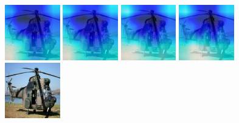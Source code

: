 \begin{figure}[H]
  {\includegraphics[height=2.4cm, width=2.4cm]{images/real-images/gradcam/5-1/2/Heat_map_of_iterations_0.png}}
  {\includegraphics[height=2.4cm, width=2.4cm]{images/real-images/gradcam/5-1/2/Heat_map_of_iterations_1.png}}
  {\includegraphics[height=2.4cm, width=2.4cm]{images/real-images/gradcam/5-1/2/Heat_map_of_iterations_3.png}}
%
  {\includegraphics[height=2.4cm, width=2.4cm]{images/real-images/gradcam/5-1/2/Heat_map_of_iterations_5.png}}
  {\includegraphics[height=2.4cm, width=2.4cm]{images/real-images/gradcam/5-1/2/Test_Images.png}}
  

\end{figure}
